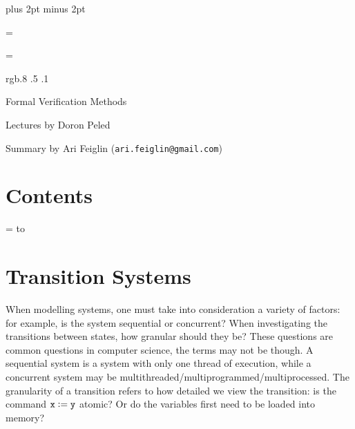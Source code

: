 

\parindent=0pt
\parskip=3pt plus 2pt minus 2pt



\footline={}


\headline={}

\color rgb{.8 .5 .1}

{\def\boxshadowcolor{rgb{.8 .6 0}}

    \centerline{Formal Verification Methods}
    \smallskip
    \centerline{Lectures by Doron Peled}
    \centerline{Summary by Ari Feiglin ({\tt ari.feiglin@gmail.com})}

\eppbox

\bigskip

    \section*{Contents}
    
    \tableofcontents
\eppbox

}

\vfill\break

\color{black}

\newif\ifpageodd
\pageoddtrue
\headline={%
    \hbox to \hsize{\color{black}%
        \ifpageodd\hfil{\it\currsubsection\quad\bf\folio}\global\pageoddfalse%
        \else{\bf\folio\quad\it\currsubsection}\hfil\global\pageoddtrue\fi%
    }%
}

\section{Transition Systems}

When modelling systems, one must take into consideration a variety of factors: for example, is the system sequential or concurrent? When investigating the transitions between states, how granular should they
be?
These questions are common questions in computer science, the terms may not be though.
A sequential system is a system with only one thread of execution, while a concurrent system may be multithreaded/multiprogrammed/multiprocessed.
The granularity of a transition refers to how detailed we view the transition: is the command $\tt x\coloneqq y$ atomic? Or do the variables first need to be loaded into memory?

